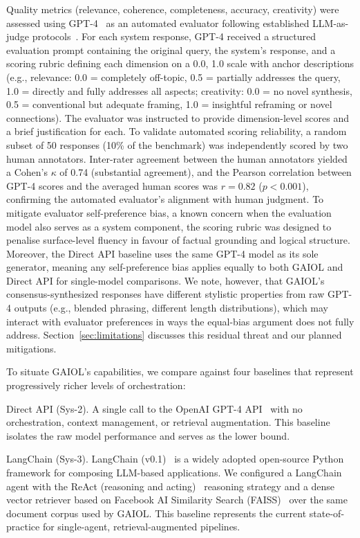\documentclass{iopjournal}
\begin{document}
Quality metrics (relevance, coherence, completeness, accuracy, creativity) were assessed using GPT-4~\cite{GPT4} as an automated evaluator following established LLM-as-judge protocols~\cite{HolisticEval}. For each system response, GPT-4 received a structured evaluation prompt containing the original query, the system's response, and a scoring rubric defining each dimension on a 0.0, 1.0 scale with anchor descriptions (e.g., relevance: 0.0 = completely off-topic, 0.5 = partially addresses the query, 1.0 = directly and fully addresses all aspects; creativity: 0.0 = no novel synthesis, 0.5 = conventional but adequate framing, 1.0 = insightful reframing or novel connections). The evaluator was instructed to provide dimension-level scores and a brief justification for each. To validate automated scoring reliability, a random subset of 50 responses (10\% of the benchmark) was independently scored by two human annotators. Inter-rater agreement between the human annotators yielded a Cohen's $\kappa$ of 0.74 (substantial agreement), and the Pearson correlation between GPT-4 scores and the averaged human scores was $r = 0.82$ ($p < 0.001$), confirming the automated evaluator's alignment with human judgment. To mitigate evaluator self-preference bias, a known concern when the evaluation model also serves as a system component, the scoring rubric was designed to penalise surface-level fluency in favour of factual grounding and logical structure. Moreover, the Direct API baseline uses the same GPT-4 model as its sole generator, meaning any self-preference bias applies equally to both GAIOL and Direct API for single-model comparisons. We note, however, that GAIOL's consensus-synthesized responses have different stylistic properties from raw GPT-4 outputs (e.g., blended phrasing, different length distributions), which may interact with evaluator preferences in ways the equal-bias argument does not fully address. Section~\ref{sec:limitations} discusses this residual threat and our planned mitigations.

To situate GAIOL's capabilities, we compare against four baselines that represent progressively richer levels of orchestration:

Direct API (Sys-2). A single call to the OpenAI GPT-4 API~\cite{GPT4} with no orchestration, context management, or retrieval augmentation. This baseline isolates the raw model performance and serves as the lower bound.

LangChain (Sys-3). LangChain (v0.1)~\cite{LangChain} is a widely adopted open-source Python framework for composing LLM-based applications. We configured a LangChain agent with the ReAct (reasoning and acting)~\cite{ReAct} reasoning strategy and a dense vector retriever based on Facebook AI Similarity Search (FAISS)~\cite{DPR} over the same document corpus used by GAIOL. This baseline represents the current state-of-practice for single-agent, retrieval-augmented pipelines.
\end{document}
